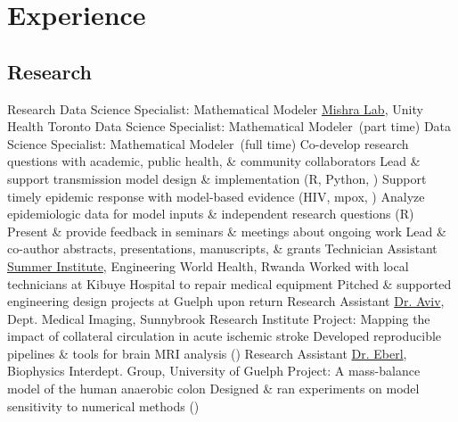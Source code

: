 \section{Experience}\twodate
\subsection{Research}
  {Research Data Science Specialist: Mathematical Modeler}
  {\href{http://mishra-lab.ca}{Mishra Lab}, Unity Health Toronto}
  {Data Science Specialist: Mathematical Modeler~\textnormal{(part time)}}{}
  {Data Science Specialist: Mathematical Modeler~\textnormal{(full time)}}{}
  \bullet Co-develop research questions with academic, public health, \& community collaborators
  \bullet Lead \& support transmission model design \& implementation (R, Python, \matlab)
  \bullet Support timely epidemic response with model-based evidence (HIV, mpox, \covid)
  \bullet Analyze epidemiologic data for model inputs \& independent research questions (R)
  \bullet Present \& provide feedback in seminars \& meetings about ongoing work
  \bullet Lead \& co-author abstracts, presentations, manuscripts, \& grants
  {Technician Assistant}
  {\href{https://www.ewh.org/the-institutes/summer-institute-programs}{Summer Institute}, Engineering World Health, Rwanda}
  \bullet Worked with local technicians at Kibuye Hospital to repair medical equipment
  \bullet Pitched \& supported engineering design projects at Guelph upon return
  {Research Assistant}
  {\href{https://www.uottawa.ca/brain/people/aviv-richard}{Dr. Aviv}, Dept. Medical Imaging, Sunnybrook Research Institute}
  \bullet Project: Mapping the impact of collateral circulation in acute ischemic stroke
  \bullet Developed reproducible pipelines \& tools for brain MRI analysis (\matlab)
  {Research Assistant}
  {\href{https://www.heberl.uoguelph.ca}{Dr. Eberl}, Biophysics Interdept. Group, University of Guelph}
  \bullet Project: A mass-balance model of the human anaerobic colon
  \bullet Designed \& ran experiments on model sensitivity to numerical methods (\matlab)
